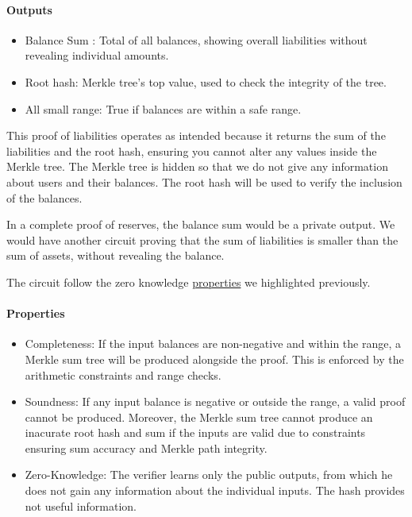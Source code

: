 \paragraph{Outputs}
\begin{itemize}
   \item Balance Sum : Total of all balances, showing overall liabilities without revealing individual amounts.
   \item Root hash: Merkle tree's top value, used to check the integrity of the tree.
   \item All small range: True if balances are within a safe range.
   \end{itemize}


This proof of liabilities operates as intended because it returns the sum of the liabilities and the root hash, ensuring you cannot alter any values inside the Merkle tree. 
The Merkle tree is hidden so that we do not give any information about users and their balances.
The root hash will be used to verify the inclusion of the balances.

In a complete proof of reserves, the balance sum would be a private output. We would have another circuit proving that the sum of liabilities is smaller
than the sum of assets, without revealing the balance.

The circuit follow the zero knowledge \hyperref[subsec:zkp]{properties} we highlighted previously. 
\paragraph{Properties}
\begin{itemize}
   \item Completeness: If the input balances are non-negative and within the range, a Merkle sum tree will be produced alongside the proof. This is enforced by the arithmetic constraints and range checks.
   \item Soundness: If any input balance is negative or outside the range, a valid proof cannot be produced. Moreover, the Merkle sum tree cannot produce an inacurate root hash and sum if the inputs are valid due to constraints ensuring sum accuracy and Merkle path integrity.
   \item Zero-Knowledge: The verifier learns only the public outputs, from which he does not gain any information about the individual inputs. The hash provides not useful information.
   \end{itemize}


